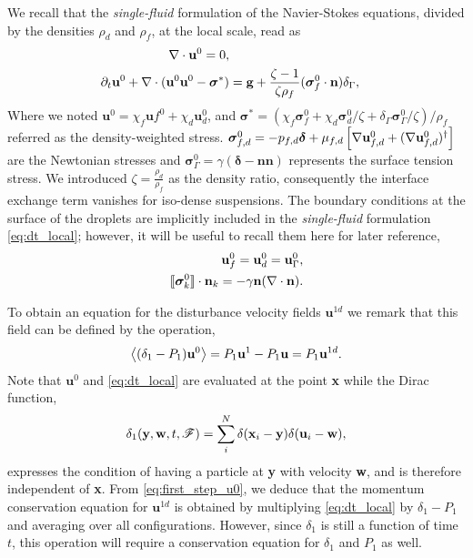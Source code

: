 We recall that the \textit{single-fluid} formulation of the Navier-Stokes equations, divided by the densities $\rho_d$ and $\rho_f$, at the local scale, read as
\begin{align}
    \label{eq:dt_local_mass}
    \div \textbf{u}^0 = 0, \\
    \pddt \textbf{u}^0
    + \div (\textbf{u}^0\textbf{u}^0 - \bm\sigma^*)
    &= \textbf{g}
    +\frac{\zeta-1}{\zeta\rho_f}(\bm\sigma_f^0\cdot \textbf{n})\delta_\Gamma,
    \label{eq:dt_local}
\end{align}
Where we noted $\textbf{u}^0 = \chi_f \textbf{u}f^0 + \chi_d \textbf{u}_d^0$, and $\bm\sigma^* = (\chi_f \bm\sigma_f^0 + \chi_d \bm\sigma_d^0/\zeta + \delta_\Gamma \bm\sigma_\Gamma^0/\zeta )/\rho_f $ referred as the density-weighted stress.
$\bm\sigma_{f,d}^0 = -p_{f,d}\bm\delta + \mu_{f,d}\left[\mathbf{\nabla} \textbf{u}_{f,d}^0+ (\mathbf{\nabla} \textbf{u}_{f,d}^0)^\dagger\right]$ are the Newtonian stresses and $\bm\sigma_\Gamma^0 = \gamma (\bm\delta - \textbf{nn})$ represents the surface tension stress. 
We introduced $\zeta = \frac{\rho_d}{\rho_f}$ as the density ratio, consequently the interface exchange term vanishes for iso-dense suspensions. 
The boundary conditions at the surface of the droplets are implicitly included in the \textit{single-fluid} formulation \eqref{eq:dt_local}; however, it will be useful to recall them here for later reference, 
\begin{align}
    \label{eq:dt_rho_I3}
    \textbf{u}_f^0 = \textbf{u}_d^0 = \textbf{u}_\Gamma^0, \\
    \Jump{\bm{\sigma}_k^0} 
    =
    -\gamma\textbf{n}(\div \textbf{n}). 
    \label{eq:dt_rho_I2}
\end{align}

To obtain an equation for the disturbance velocity fields $\textbf{u}^{1d}$ we remark that this field can be defined by the operation, 
\begin{equation}
    \avg{(\delta_1 - P_1) \textbf{u}^0}
    =
    P_1 \textbf{u}^1
    - P_1 \textbf{u}
    = P_1 \textbf{u}^{1d}. 
    \label{eq:first_step_u0}
\end{equation}
Note that $\textbf{u}^0$ and \ref{eq:dt_local} are evaluated at the point \textbf{x} while the Dirac function, 
\begin{equation}
    \delta_1(\textbf{y},\textbf{w},t,\mathscr{F}) = \sum_i^N \delta(\textbf{x}_i-\textbf{y})\delta(\textbf{u}_i - \textbf{w}),
\end{equation}
expresses the condition of having a particle at \textbf{y} with velocity \textbf{w}, and is therefore independent of \textbf{x}. 
From \ref{eq:first_step_u0}, we deduce that the momentum conservation equation for $\textbf{u}^{1d}$ is obtained by multiplying \ref{eq:dt_local} by $\delta_1 - P_1$ and averaging over all configurations. 
However, since $\delta_1$ is still a function of time $t$, this operation will require a conservation equation for $\delta_1$ and $P_1$ as well.  

